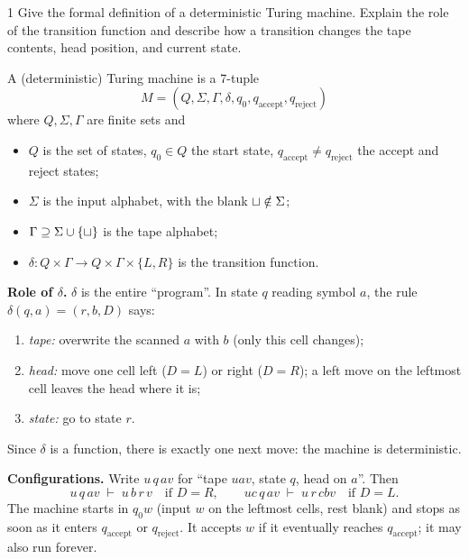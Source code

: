 \begin{question}{1}
Give the formal definition of a deterministic Turing machine. Explain the role of the transition function and describe how a transition changes the tape contents, head position, and current state.
\end{question}
\begin{soln}
A (deterministic) Turing machine is a 7-tuple
\[
M=(Q,\Sigma,\Gamma,\delta,q_0,q_{\mathrm{accept}},q_{\mathrm{reject}})
\]
where $Q,\Sigma,\Gamma$ are finite sets and
\begin{itemize}
\item $Q$ is the set of states, $q_0\in Q$ the start state, $q_{\mathrm{accept}}\neq q_{\mathrm{reject}}$ the accept and reject states;
\item $\Sigma$ is the input alphabet, with the blank $\sqcup\notin\Sigma$;
\item $\Gamma\supseteq\Sigma\cup\{\sqcup\}$ is the tape alphabet;
\item $\delta: Q\times\Gamma\to Q\times\Gamma\times\{L,R\}$ is the transition function.
\end{itemize}

\textbf{Role of $\delta$.} $\delta$ is the entire ``program''. In state $q$ reading symbol $a$, the rule $\delta(q,a)=(r,b,D)$ says:
\begin{enumerate}
\item \emph{tape:} overwrite the scanned $a$ with $b$ (only this cell changes);
\item \emph{head:} move one cell left ($D=L$) or right ($D=R$); a left move on the leftmost cell leaves the head where it is;
\item \emph{state:} go to state $r$.
\end{enumerate}
Since $\delta$ is a function, there is exactly one next move: the machine is deterministic.

\textbf{Configurations.} Write $u\,q\,av$ for ``tape $uav$, state $q$, head on $a$''. Then
\[
u\,q\,av \;\vdash\; u\,b\,r\,v \quad\text{if } D=R,
\qquad
uc\,q\,av \;\vdash\; u\,r\,cbv \quad\text{if } D=L .
\]
The machine starts in $q_0w$ (input $w$ on the leftmost cells, rest blank) and stops as soon as it enters $q_{\mathrm{accept}}$ or $q_{\mathrm{reject}}$. It accepts $w$ if it eventually reaches $q_{\mathrm{accept}}$; it may also run forever.
\end{soln}

